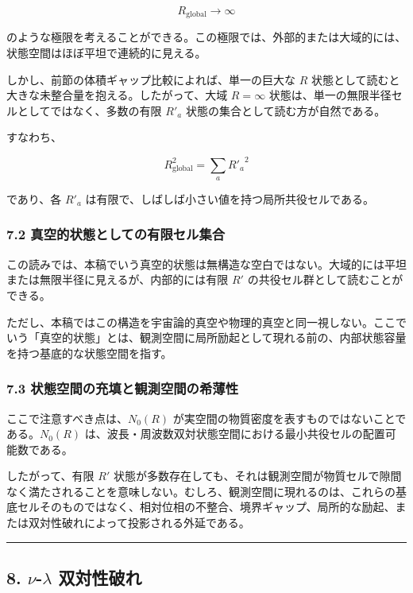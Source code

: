 \documentclass[
]{ltjsarticle}
\begin{document}
\[
R_{\mathrm{global}}\to\infty
\]

のような極限を考えることができる。この極限では、外部的または大域的には、状態空間はほぼ平坦で連続的に見える。

しかし、前節の体積ギャップ比較によれば、単一の巨大な \(R\)
状態として読むと大きな未整合量を抱える。したがって、大域 \(R=\infty\)
状態は、単一の無限半径セルとしてではなく、多数の有限 \(R'_a\)
状態の集合として読む方が自然である。

すなわち、

\[
R_{\mathrm{global}}^2=\sum_a {R'_a}^2
\]

であり、各 \(R'_a\) は有限で、しばしば小さい値を持つ局所共役セルである。

\subsubsection{7.2
真空的状態としての有限セル集合}\label{ux771fux7a7aux7684ux72b6ux614bux3068ux3057ux3066ux306eux6709ux9650ux30bbux30ebux96c6ux5408}

この読みでは、本稿でいう真空的状態は無構造な空白ではない。大域的には平坦または無限半径に見えるが、内部的には有限
\(R'\) の共役セル群として読むことができる。

ただし、本稿ではこの構造を宇宙論的真空や物理的真空と同一視しない。ここでいう「真空的状態」とは、観測空間に局所励起として現れる前の、内部状態容量を持つ基底的な状態空間を指す。

\subsubsection{7.3
状態空間の充填と観測空間の希薄性}\label{ux72b6ux614bux7a7aux9593ux306eux5145ux586bux3068ux89b3ux6e2cux7a7aux9593ux306eux5e0cux8584ux6027}

ここで注意すべき点は、\(N_0(R)\)
が実空間の物質密度を表すものではないことである。\(N_0(R)\)
は、波長・周波数双対状態空間における最小共役セルの配置可能数である。

したがって、有限 \(R'\)
状態が多数存在しても、それは観測空間が物質セルで隙間なく満たされることを意味しない。むしろ、観測空間に現れるのは、これらの基底セルそのものではなく、相対位相の不整合、境界ギャップ、局所的な励起、または双対性破れによって投影される外延である。

\begin{center}\rule{0.5\linewidth}{0.5pt}\end{center}

\subsection{\texorpdfstring{8. \(\nu\)-\(\lambda\)
双対性破れ}{8. \textbackslash nu-\textbackslash lambda 双対性破れ}}\label{nu-lambda-ux53ccux5bfeux6027ux7834ux308c}
\end{document}
